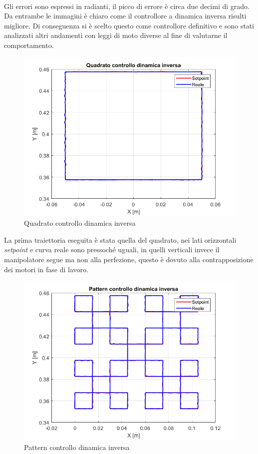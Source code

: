 \\Gli errori sono espressi in radianti, il picco di errore è circa due decimi di grado. Da entrambe le immagini è chiaro come il controllore a dinamica inversa risulti migliore. Di conseguenza si è scelto questo come controllore definitivo e sono stati analizzati altri andamenti con leggi di moto diverse al fine di valutarne il comportamento.
\begin{figure}[ht]
	\begin{center}
		\includegraphics[scale=0.45]{Immagini/Traiettorie/QuadratoDinamicaInversa}
		\caption{Quadrato controllo dinamica inversa}
		\label{fig:quadID}
	\end{center}
\end{figure}
La prima traiettoria eseguita è stata quella del quadrato, nei lati orizzontali \textit{setpoint} e curva reale sono pressoché uguali, in quelli verticali invece il manipolatore segue ma non alla perfezione, questo è dovuto alla contrapposizione dei motori in fase di lavoro. 
\begin{figure}[ht]
	\begin{center}
		\includegraphics[scale=0.45]{Immagini/Traiettorie/PatternDinamicaInversa}
		\caption{Pattern controllo dinamica inversa}
		\label{fig:patternID}
	\end{center}
\end{figure}
